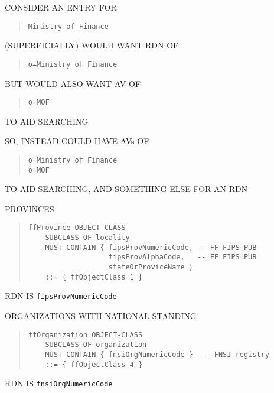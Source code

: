 \begin{bwslide}

\begin{nrtc}
\item	CONSIDER AN ENTRY FOR
\begin{quote}\begin{verbatim}
Ministry of Finance
\end{verbatim}\end{quote}

\item	(SUPERFICIALLY) WOULD WANT RDN OF
\begin{quote}\begin{verbatim}
o=Ministry of Finance
\end{verbatim}\end{quote}

\item	BUT WOULD ALSO WANT AV OF
\begin{quote}\begin{verbatim}
o=MOF
\end{verbatim}\end{quote}
TO AID SEARCHING

\item	SO, INSTEAD COULD HAVE AVs OF
\begin{quote}\begin{verbatim}
o=Ministry of Finance
o=MOF
\end{verbatim}\end{quote}
TO AID SEARCHING, AND SOMETHING ELSE FOR AN RDN
\end{nrtc}
\end{bwslide}


\begin{bwslide}

\begin{nrtc}
\item	PROVINCES
\begin{quote}\begin{verbatim}
ffProvince OBJECT-CLASS
    SUBCLASS OF locality
    MUST CONTAIN { fipsProvNumericCode, -- FF FIPS PUB
                   fipsProvAlphaCode,   -- FF FIPS PUB
                   stateOrProviceName }
    ::= { ffObjectClass 1 }
\end{verbatim}\end{quote}
RDN IS \verb"fipsProvNumericCode"

\item	ORGANIZATIONS WITH NATIONAL STANDING
\begin{quote}\begin{verbatim}
ffOrganization OBJECT-CLASS
    SUBCLASS OF organization
    MUST CONTAIN { fnsiOrgNumericCode }  -- FNSI registry
    ::= { ffObjectClass 4 }
\end{verbatim}\end{quote}
RDN IS \verb"fnsiOrgNumericCode"
\end{nrtc}
\end{bwslide}



